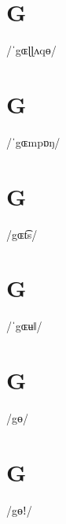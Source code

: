 \documentclass[10pt,a4paper,twoside]{book}
\begin{document}
\section*{G}

\begin{multicols}{3}
 {/ˈgɶɭɭʌqɵ/} {}
\end{multicols}

\section*{G}

\begin{multicols}{3}
 {/ˈgɶmpɒŋ/} {}
\end{multicols}

\section*{G}

\begin{multicols}{3}
 {/gɶt͡s/} {}
\end{multicols}

\section*{G}

\begin{multicols}{3}
 {/ˈgɶʉǁ/} {}
\end{multicols}

\section*{G}

\begin{multicols}{3}
 {/gɵ/} {}
\end{multicols}

\section*{G}

\begin{multicols}{3}
 {/gɵǃ/} {}
\end{multicols}
\end{document}
